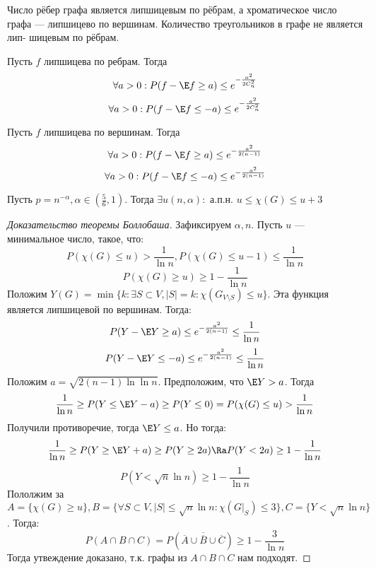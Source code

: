 \begin{example}
    Число рёбер графа является липшицевым по рёбрам, а хроматическое число графа — липшицево по вершинам. Количество треугольников в графе не является лип- шицевым по рёбрам.
\end{example}

\begin{theorem}[б/д]
    Пусть \(f\) липшицева по ребрам. Тогда
    \[\forall a > 0: P(f - \E f \ge a) \le e^{-\frac{a^2}{2C_n^2}}\]
    \[\forall a > 0: P(f - \E f \le -a) \le e^{-\frac{a^2}{2C_n^2}}\]

\end{theorem}
\begin{theorem}[б/д]
    Пусть \(f\) липшицева по вершинам. Тогда
    \[\forall a > 0: P(f - \E f \ge a) \le e^{-\frac{a^2}{2(n - 1)}}\]
    \[\forall a > 0: P(f - \E f \le -a) \le e^{-\frac{a^2}{2(n - 1)}}\]
\end{theorem}
\begin{theorem}[Боллобаш]
    Пусть \(p = n^{-\alpha}, \alpha \in \left( \frac{5}{6}, 1 \right)\). Тогда \(\exists u(n, \alpha):\) а.п.н. \(u \le \chi(G) \le u + 3\)
\end{theorem}
\begin{proof}[Доказательство теоремы Боллобаша]
    Зафиксируем \(\alpha, n\). Пусть \(u\) --- минимальное число, такое, что:
    \[P(\chi(G) \le u) > \frac{1}{\ln n}, P(\chi(G) \le u - 1) \le \frac{1}{\ln n}\]
    \[P(\chi(G) \ge u) \ge 1 - \frac{1}{\ln n}\]
    Положим \(Y(G) = \min \{k: \exists S \subset V, |S| = k: \chi(G_{V \setminus S}) \le u\}\). Эта функция является липшицевой по вершинам. Тогда:
    \[P(Y - \E Y \ge a) \le e^{-\frac{a^2}{2(n - 1)}} \le \frac{1}{\ln n}\]
    \[P(Y - \E Y \le -a) \le e^{-\frac{a^2}{2(n - 1)}} \le \frac{1}{\ln n}\]
    Положим \(a = \sqrt{2(n - 1)\ln\ln n}\). Предположим, что \(\E Y > a\). Тогда
    \[\frac{1}{\ln n} \ge P(Y \le \E Y - a) \ge P(Y \le 0) = P(\chi(G) \le u) > \frac{1}{\ln n}\]
    Получили противоречие, тогда \(\E Y \le a\). Но тогда:
    \[\frac{1}{\ln n} \ge P(Y \ge \E Y + a) \ge P(Y \ge 2a) \Ra P(Y < 2a) \ge 1 - \frac{1}{\ln n}\]
    \[P(Y < \sqrt{n}\ln n) \ge 1 - \frac{1}{\ln n}\]
    Пололжим за \(A = \{\chi(G) \ge u\}, B = \{\forall S \subset V, |S| \le \sqrt{n}\ln n: \chi\left( G|_S \right)\le 3\}, C = \{Y < \sqrt{n}\ln n\}\). Тогда:
    \[P(A \cap B \cap C) = P(\overline{\overline{A} \cup \overline{B} \cup \overline{C}}) \ge 1 - \frac{3}{\ln n}\]
    Тогда утвеждение доказано, т.к. графы из \(A \cap B \cap C\) нам подходят.
\end{proof}

